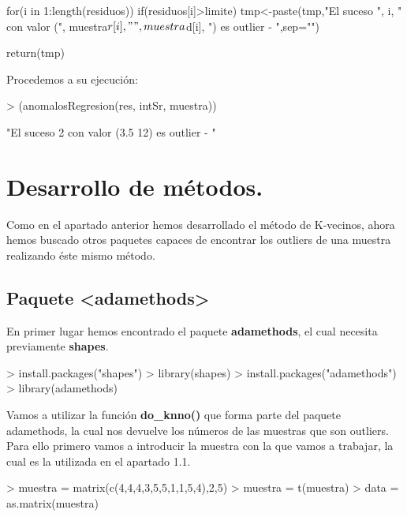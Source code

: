 \documentclass [a4paper] {article}
\begin{document}
\begin{enumerate}
\begin{Schunk}
\begin{Soutput}
{    for(i in 1:length(residuos)){
        if(residuos[i]>limite){
            tmp<-paste(tmp,"El suceso ", i, 
                " con valor (", muestra$r[i]," ",
                 muestra$d[i], ") es outlier - ",sep="")
        }
    }

    return(tmp)
}
\end{Soutput}
\end{Schunk}

\bigskip
Procedemos a su ejecución:
\begin{Schunk}
\begin{Sinput}
> (anomalosRegresion(res, intSr, muestra))
\end{Sinput}
\begin{Soutput}
[1] "El suceso 2 con valor (3.5 12) es outlier - "
\end{Soutput}
\end{Schunk}

\end{enumerate}

\bigskip
\section{Desarrollo de métodos.}

\bigskip
Como en el apartado anterior hemos desarrollado el método de K-vecinos, ahora hemos buscado
otros paquetes capaces de encontrar los outliers de una muestra realizando éste mismo método.

\subsection{Paquete <adamethods>}
\bigskip
En primer lugar hemos encontrado el paquete \textbf{adamethods}, el cual necesita previamente
\textbf{shapes}.
\begin{Schunk}
\begin{Sinput}
> install.packages("shapes")
> library(shapes)
> install.packages("adamethods")
> library(adamethods)
\end{Sinput}
\end{Schunk}

\bigskip
Vamos a utilizar la función \textbf{do\_knno()} que forma parte del paquete adamethods, la cual
nos devuelve los números de las muestras que son outliers. Para ello primero vamos a introducir
la muestra con la que vamos a trabajar, la cual es la utilizada en el apartado 1.1.
\begin{Schunk}
\begin{Sinput}
> muestra = matrix(c(4,4,4,3,5,5,1,1,5,4),2,5)
> muestra = t(muestra)
> data = as.matrix(muestra)
\end{Sinput}
\end{Schunk}
\end{document}
